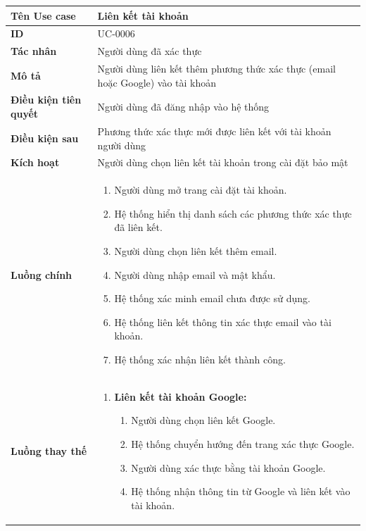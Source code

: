 {
\small
\renewcommand{\arraystretch}{1.15}

\begin{tabularx}{\textwidth}{|>{\raggedright\arraybackslash}p{3.5cm}|>{\raggedright\arraybackslash}X|}
\hline
\textbf{Tên Use case} & Liên kết tài khoản \\
\hline
\textbf{ID} & UC-0006 \\
\hline
\textbf{Tác nhân} & Người dùng đã xác thực \\
\hline
\textbf{Mô tả} & Người dùng liên kết thêm phương thức xác thực (email hoặc Google) vào tài khoản \\
\hline
\textbf{Điều kiện tiên quyết} & Người dùng đã đăng nhập vào hệ thống \\
\hline
\textbf{Điều kiện sau} & Phương thức xác thực mới được liên kết với tài khoản người dùng \\
\hline
\textbf{Kích hoạt} & Người dùng chọn liên kết tài khoản trong cài đặt bảo mật \\
\hline
\textbf{Luồng chính} &
\begin{enumerate}
    \item Người dùng mở trang cài đặt tài khoản.
    \item Hệ thống hiển thị danh sách các phương thức xác thực đã liên kết.
    \item Người dùng chọn liên kết thêm email.
    \item Người dùng nhập email và mật khẩu.
    \item Hệ thống xác minh email chưa được sử dụng.
    \item Hệ thống liên kết thông tin xác thực email vào tài khoản.
    \item Hệ thống xác nhận liên kết thành công.
\end{enumerate} \\
\hline
\textbf{Luồng thay thế} &
\begin{enumerate}
    \item \textbf{Liên kết tài khoản Google:}
    \begin{enumerate}
        \item[3A.] Người dùng chọn liên kết Google.
        \item[4A.] Hệ thống chuyển hướng đến trang xác thực Google.
        \item[5A.] Người dùng xác thực bằng tài khoản Google.
        \item[6A.] Hệ thống nhận thông tin từ Google và liên kết vào tài khoản.
    \end{enumerate}

\end{enumerate}
\end{tabularx}}
